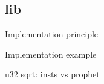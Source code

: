 \subsection{lib} \label{sec:lib}

    Implementation principle

    Implementation example 
    
    u32 sqrt: insts vs prophet